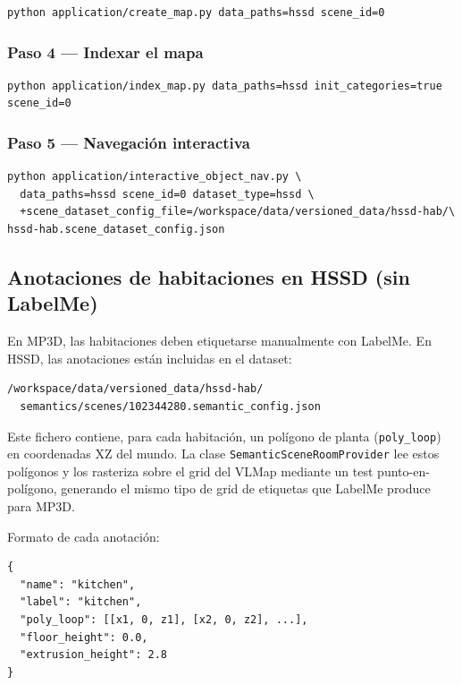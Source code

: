 \documentclass[11pt,a4paper]{article}
\begin{document}
\begin{verbatim}
python application/create_map.py data_paths=hssd scene_id=0
\end{verbatim}

\subsubsection*{Paso 4 --- Indexar el mapa}

\begin{verbatim}
python application/index_map.py data_paths=hssd init_categories=true scene_id=0
\end{verbatim}

\subsubsection*{Paso 5 --- Navegación interactiva}

\begin{verbatim}
python application/interactive_object_nav.py \
  data_paths=hssd scene_id=0 dataset_type=hssd \
  +scene_dataset_config_file=/workspace/data/versioned_data/hssd-hab/\
hssd-hab.scene_dataset_config.json
\end{verbatim}

\subsection{Anotaciones de habitaciones en HSSD (sin LabelMe)}

En MP3D, las habitaciones deben etiquetarse manualmente con LabelMe. En HSSD, las anotaciones están incluidas en el dataset:

\begin{verbatim}
/workspace/data/versioned_data/hssd-hab/
  semantics/scenes/102344280.semantic_config.json
\end{verbatim}

Este fichero contiene, para cada habitación, un polígono de planta (\texttt{poly\_loop}) en coordenadas XZ del mundo. La clase \texttt{SemanticSceneRoomProvider} lee estos polígonos y los rasteriza sobre el grid del VLMap mediante un test punto-en-polígono, generando el mismo tipo de grid de etiquetas que LabelMe produce para MP3D.

Formato de cada anotación:
\begin{verbatim}
{
  "name": "kitchen",
  "label": "kitchen",
  "poly_loop": [[x1, 0, z1], [x2, 0, z2], ...],
  "floor_height": 0.0,
  "extrusion_height": 2.8
}
\end{verbatim}
\end{document}
